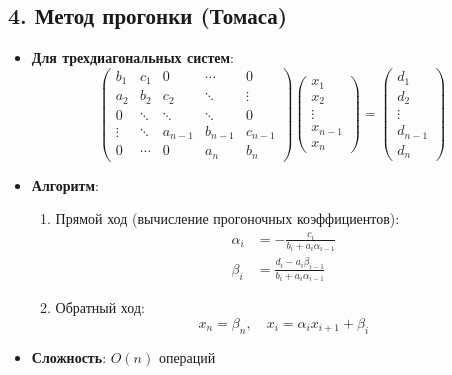 \documentclass[12pt, a4paper]{article}
\begin{document}
\subsection*{4. Метод прогонки (Томаса)}
\begin{itemize}
\item \textbf{Для трехдиагональных систем}:
\begin{equation*}
\begin{pmatrix}
b_1 & c_1 & 0 & \cdots & 0 \\
a_2 & b_2 & c_2 & \ddots & \vdots \\
0 & \ddots & \ddots & \ddots & 0 \\
\vdots & \ddots & a_{n-1} & b_{n-1} & c_{n-1} \\
0 & \cdots & 0 & a_n & b_n
\end{pmatrix}
\begin{pmatrix}
x_1 \\ x_2 \\ \vdots \\ x_{n-1} \\ x_n
\end{pmatrix} =
\begin{pmatrix}
d_1 \\ d_2 \\ \vdots \\ d_{n-1} \\ d_n
\end{pmatrix}
\end{equation*}
\item \textbf{Алгоритм}:
\begin{enumerate}
\item Прямой ход (вычисление прогоночных коэффициентов):
\begin{align*}
\alpha_i &= -\frac{c_i}{b_i + a_i\alpha_{i-1}} \\
\beta_i &= \frac{d_i - a_i\beta_{i-1}}{b_i + a_i\alpha_{i-1}}
\end{align*}
\item Обратный ход:
\begin{equation*}
x_n = \beta_n, \quad x_i = \alpha_i x_{i+1} + \beta_i
\end{equation*}
\end{enumerate}
\item \textbf{Сложность}: $O(n)$ операций
\end{itemize}
\end{document}
